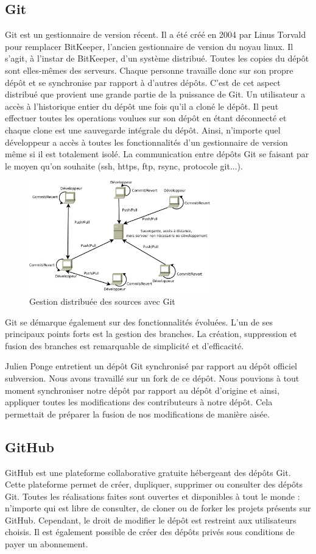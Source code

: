 \subsection{Git}
Git est un gestionnaire de version récent. Il a été créé en 2004 par Linus Torvald pour remplacer BitKeeper, l'ancien gestionnaire de version du noyau linux.
Il s'agit, à l'instar de BitKeeper, d'un système distribué.
Toutes les copies du dépôt sont elles-mêmes des serveurs.
Chaque personne travaille donc sur son propre dépôt et se synchronise par rapport à d'autres dépôts.
C'est de cet aspect distribué que provient une grande partie de la puissance de Git.
Un utilisateur a accès à l'historique entier du dépôt une fois qu'il a cloné le dépôt.
Il peut effectuer toutes les operations voulues sur son dépôt en étant déconnecté et chaque clone est une sauvegarde intégrale du dépôt.
Ainsi, n'importe quel développeur a accès à toutes les fonctionnalités d'un gestionnaire de version même si il est totalement isolé.
La communication entre dépôts Git se faisant par le moyen qu'on souhaite (ssh, https, ftp, rsync, protocole git...).
\begin{figure}[H]
	\centering
	\includegraphics[width=0.7\textwidth]{../image/git.png}
	\caption{Gestion distribuée des sources avec Git}
\end{figure}

Git se démarque également sur des fonctionnalités évoluées.
L'un de ses principaux points forts est la gestion des branches.
La création, suppression et fusion des branches est remarquable de simplicité et d'efficacité.

Julien Ponge entretient un dépôt Git synchronisé par rapport au dépôt officiel subversion.
Nous avons travaillé sur un fork de ce dépôt.
Nous pouvions à tout moment synchroniser notre dépôt par rapport au dépôt d'origine et ainsi, appliquer toutes les modifications des contributeurs à notre dépôt.
Cela permettait de préparer la fusion de nos modifications de manière aisée. 
\subsection{GitHub}
GitHub est une plateforme collaborative gratuite hébergeant des dépôts Git.
Cette plateforme permet de créer, dupliquer, supprimer ou consulter des dépôts Git.
Toutes les réalisations faites sont ouvertes et disponibles à tout le monde : n'importe qui est libre de consulter, de cloner ou de forker les projets présents sur GitHub.
Cependant, le droit de modifier le dépôt est restreint aux utilisateurs choisis.
Il est également possible de créer des dépôts privés sous conditions de payer un abonnement.

